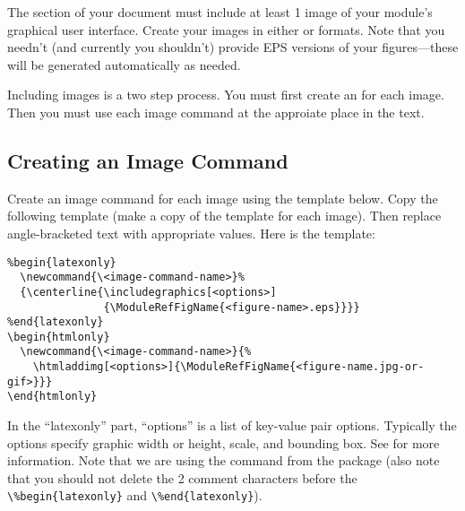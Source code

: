 \documentclass[11pt]{article}
\begin{document}
The  section of your document must include at
least 1 image of your module's graphical user interface. Create your
images in either  or  formats.  Note that
you needn't (and currently you shouldn't) provide EPS versions of your
figures---these will be generated automatically as needed.

Including images is a two step process.  You must first create an
 for each image.   Then you must use each
image command at the approiate place in the text.


\subsection{Creating an Image Command}
\label{sec:crimgcmd}

Create an image command for each image using the template below.  Copy the
following template (make a copy of the template for each image).  Then
replace angle-bracketed text with appropriate values.  Here is the template:

\begin{verbatim}
%begin{latexonly}
  \newcommand{\<image-command-name>}%
  {\centerline{\includegraphics[<options>]
               {\ModuleRefFigName{<figure-name>.eps}}}}
%end{latexonly}
\begin{htmlonly}
  \newcommand{\<image-command-name>}{%
    \htmladdimg[<options>]{\ModuleRefFigName{<figure-name.jpg-or-gif>}}}
\end{htmlonly}
\end{verbatim}



In the ``latexonly'' part, ``options'' is a list of key-value pair options.
Typically the options specify graphic width or height, scale, and bounding
box.  See  for more information.  Note
that we are using the  command from the
 package (also note that you should not delete the 2
comment characters before the \verb|\%begin{latexonly}| and
\verb|\%end{latexonly}|). 
\end{document}
